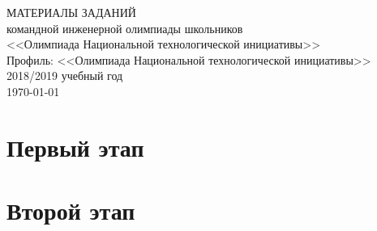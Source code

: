 \documentclass[a4paper,12pt,oneside]{book}
\begin{document}
\begin{titlepage}
    \begin{center}
        \huge{МАТЕРИАЛЫ ЗАДАНИЙ} \\
        \Large{командной инженерной олимпиады школьников} \\
        \Large{<<Олимпиада Национальной технологической инициативы>>} \\
        \Large{Профиль: <<Олимпиада Национальной технологической инициативы>>} \\
        \large{2018/2019 учебный год} \\
        \vspace{2cm}
        \Large{\today}  
    \end{center}
\end{titlepage}

\setcounter{tocdepth}{1}

\tableofcontents

\part{Первый этап}




%

\part{Второй этап}

%
\end{document}

